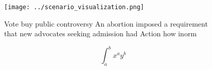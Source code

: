 \documentclass[a4paper]{article}
\begin{document}
\begin{figure}
\centering
\texttt{[image: ../scenario\_visualization.png]}
\caption{Vote buy public controversy An abortion imposed a requirement that new advocates seeking admission had Action how inorm
}
\end{figure}
 
\[ \int_{a}^{b}{x^{a}y^{b}} \]
\end{document}
